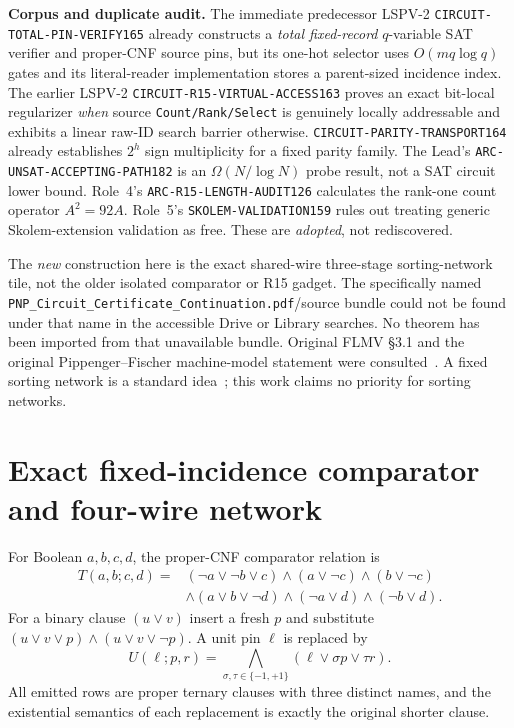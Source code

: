 \documentclass[11pt]{article}
\begin{document}
\noindent\textbf{Corpus and duplicate audit.} The immediate predecessor LSPV-2 \texttt{CIRCUIT-TOTAL-PIN-VERIFY165} already constructs a \emph{total fixed-record} $q$-variable SAT verifier and proper-CNF source pins, but its one-hot selector uses $O(mq\log q)$ gates and its literal-reader implementation stores a parent-sized incidence index. The earlier LSPV-2 \texttt{CIRCUIT-R15-VIRTUAL-ACCESS163} proves an exact bit-local regularizer \emph{when} source \texttt{Count/Rank/Select} is genuinely locally addressable and exhibits a linear raw-ID search barrier otherwise. \texttt{CIRCUIT-PARITY-TRANSPORT164} already establishes $2^h$ sign multiplicity for a fixed parity family. The Lead's \texttt{ARC-UNSAT-ACCEPTING-PATH182} is an $\Omega(N/\log N)$ probe result, not a SAT circuit lower bound. Role~4's \texttt{ARC-R15-LENGTH-AUDIT126} calculates the rank-one count operator $A^2=92A$. Role~5's \texttt{SKOLEM-VALIDATION159} rules out treating generic Skolem-extension validation as free. These are \emph{adopted}, not rediscovered.

The \emph{new} construction here is the exact shared-wire three-stage sorting-network tile, not the older isolated comparator or R15 gadget. The specifically named \texttt{PNP\_Circuit\_Certificate\_Continuation.pdf}/source bundle could not be found under that name in the accessible Drive or Library searches. No theorem has been imported from that unavailable bundle. Original FLMV \S3.1 and the original Pippenger--Fischer machine-model statement were consulted~\cite{flmv2005,pippenger1979}. A fixed sorting network is a standard idea~\cite{batcher1968}; this work claims no priority for sorting networks.

\section{Exact fixed-incidence comparator and four-wire network}
For Boolean $a,b,c,d$, the proper-CNF comparator relation is
\begin{equation}
\begin{aligned}
T(a,b;c,d)={}&(\neg a\vee\neg b\vee c)\land (a\vee\neg c)\land(b\vee\neg c)\\
&\land(a\vee b\vee\neg d)\land(\neg a\vee d)\land(\neg b\vee d).
\end{aligned}\label{eq:cmp}
\end{equation}
For a binary clause $(u\vee v)$ insert a fresh $p$ and substitute $(u\vee v\vee p)\land(u\vee v\vee\neg p)$. A unit pin $\ell$ is replaced by
\begin{equation}
U(\ell;p,r)=\bigwedge_{\sigma,\tau\in\{-1,+1\}}(\ell\vee\sigma p\vee\tau r).
\label{eq:unit}
\end{equation}
All emitted rows are proper ternary clauses with three distinct names, and the existential semantics of each replacement is exactly the original shorter clause.
\end{document}
